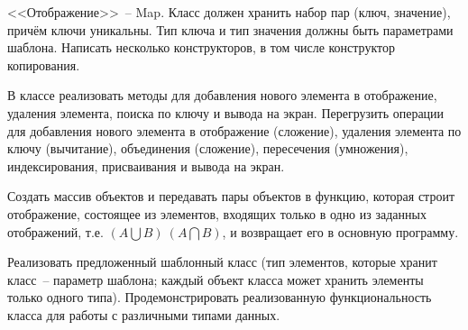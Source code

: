 
<<Отображение>>~-- Map. Класс должен хранить набор пар (ключ, значение), причём ключи
уникальны. Тип ключа и тип значения должны быть параметрами шаблона. Написать
несколько конструкторов, в том числе конструктор копирования.

В классе реализовать
методы для добавления нового элемента в отображение, удаления элемента, поиска по
ключу и вывода на экран. Перегрузить операции для добавления нового элемента в
отображение (сложение), удаления элемента по ключу (вычитание), объединения
(сложение), пересечения (умножения), индексирования, присваивания и вывода на экран.

Создать массив объектов и передавать пары объектов в функцию, которая строит
отображение, состоящее из элементов, входящих только в одно из заданных отображений,
т.е. $(A\bigcup B) \ (A\bigcap B)$, и возвращает его в основную программу.

Реализовать предложенный шаблонный класс (тип элементов, которые
хранит класс~-- параметр шаблона; каждый объект класса может хранить
элементы только одного типа). Продемонстрировать реализованную
функциональность класса для работы с различными типами данных.
